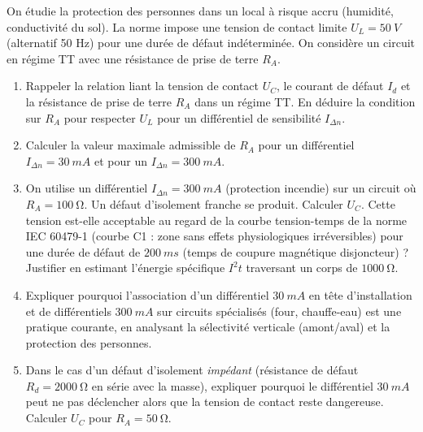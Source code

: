 \documentclass[11pt]{article}
\begin{document}
\begin{exercice}
On étudie la protection des personnes dans un local à risque accru (humidité, conductivité du sol). La norme impose une tension de contact limite $U_L=\SI{50}{V}$ (alternatif 50 Hz) pour une durée de défaut indéterminée. On considère un circuit en régime TT avec une résistance de prise de terre $R_A$.
\begin{enumerate}
    \item Rappeler la relation liant la tension de contact $U_C$, le courant de défaut $I_d$ et la résistance de prise de terre $R_A$ dans un régime TT. En déduire la condition sur $R_A$ pour respecter $U_L$ pour un différentiel de sensibilité $I_{\Delta n}$.
    \item Calculer la valeur maximale admissible de $R_A$ pour un différentiel $I_{\Delta n}=\SI{30}{mA}$ et pour un $I_{\Delta n}=\SI{300}{mA}$.
    \item On utilise un différentiel $I_{\Delta n}=\SI{300}{mA}$ (protection incendie) sur un circuit où $R_A=\SI{100}{\ohm}$. Un défaut d'isolement franche se produit. Calculer $U_C$. Cette tension est-elle acceptable au regard de la courbe tension-temps de la norme IEC 60479-1 (courbe C1 : zone sans effets physiologiques irréversibles) pour une durée de défaut de $\SI{200}{ms}$ (temps de coupure magnétique disjoncteur) ? Justifier en estimant l'énergie spécifique $I^2t$ traversant un corps de $\SI{1000}{\ohm}$.
    \item Expliquer pourquoi l'association d'un différentiel $\SI{30}{mA}$ en tête d'installation et de différentiels $\SI{300}{mA}$ sur circuits spécialisés (four, chauffe-eau) est une pratique courante, en analysant la sélectivité verticale (amont/aval) et la protection des personnes.
    \item Dans le cas d'un défaut d'isolement \textit{impédant} (résistance de défaut $R_d=\SI{2000}{\ohm}$ en série avec la masse), expliquer pourquoi le différentiel $\SI{30}{mA}$ peut ne pas déclencher alors que la tension de contact reste dangereuse. Calculer $U_C$ pour $R_A=\SI{50}{\ohm}$.
\end{enumerate}
\end{exercice}
\end{document}
